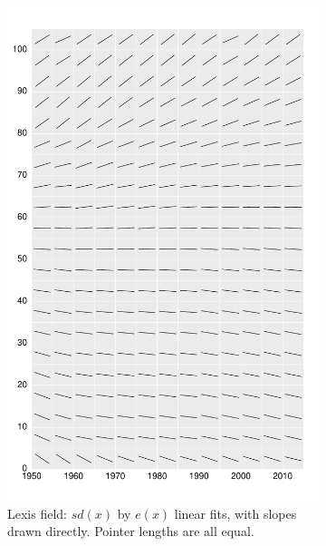 \documentclass{article}
\begin{document}
\begin{figure}
\begin{subfigure}{.48\textwidth}
\captionsetup{width=.8\linewidth}
  \centering
  \includegraphics[scale=.38]{Figures/FigApp1.pdf}
  \caption{Lexis field: $sd(x)$ by $e(x)$ linear fits, with slopes drawn directly. Pointer lengths are all equal.}
  \label{fig:sfig1}
\end{subfigure}%
\begin{subfigure}{.48\textwidth}
\captionsetup{width=.8\linewidth}
  \centering

\end{subfigure}
\end{figure}
\end{document}
